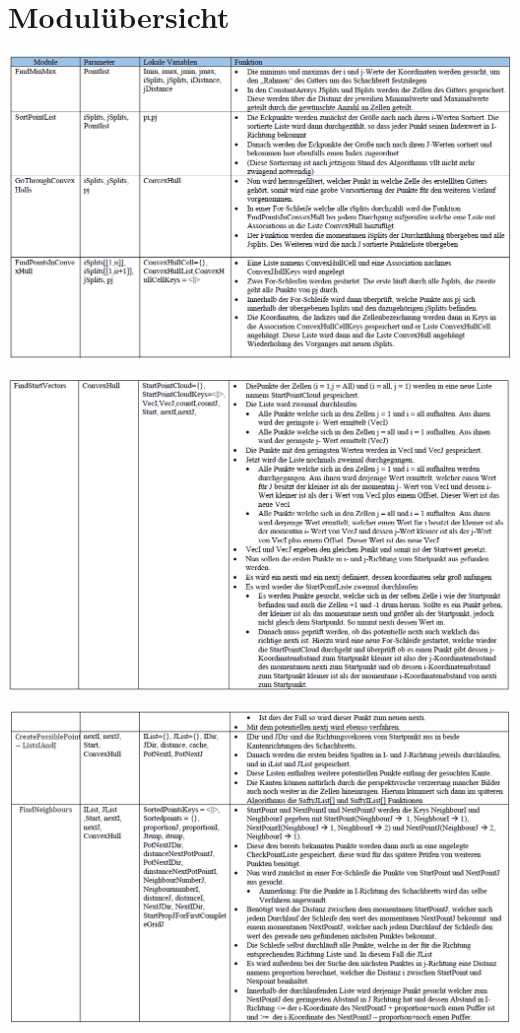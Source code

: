 \section{Modulübersicht}


\begin{minipage}{\linewidth}
	\centering
	\includegraphics[width=1\linewidth]{images/KD1.png}
\end{minipage}
\begin{minipage}{\linewidth}
	\centering
	\includegraphics[width=1\linewidth]{images/KD2.png}
\end{minipage}
\begin{minipage}{\linewidth}
	\centering
	\includegraphics[width=1\linewidth]{images/KD3.png}
\end{minipage}
